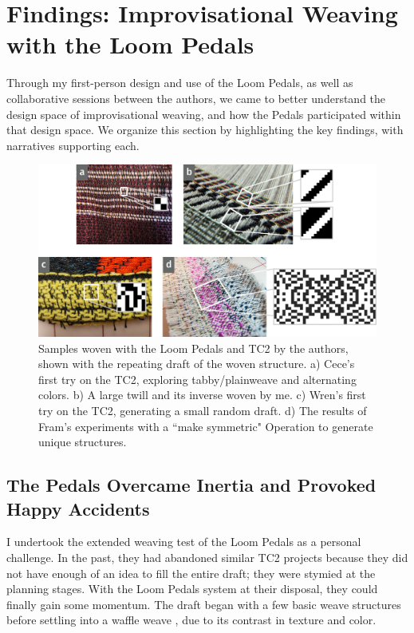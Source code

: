 \section{Findings: Improvisational Weaving with the Loom Pedals}

Through my first-person design and use of the Loom Pedals, as well as collaborative sessions between the authors, we came to better understand the design space of improvisational weaving, and how the Pedals participated within that design space. We organize this section by highlighting the key findings, with narratives supporting each.

\begin{figure}
    \centering
    \includegraphics[width=\linewidth]{figs/LP_author-samples.png}
    \caption[Samples woven with the Loom Pedals and TC2.]{Samples woven with the Loom Pedals and TC2 by the authors, shown with the repeating draft of the woven structure. a) Cece's first try on the TC2, exploring tabby/plainweave and alternating colors. b) A large twill and its inverse woven by me. c) Wren's first try on the TC2, generating a small random draft. d) The results of Fram's experiments with a ``make symmetric" Operation to generate unique structures.}
    \label{fig:author-samples}
\end{figure}

\subsection{The Pedals Overcame Inertia and Provoked Happy Accidents}

I undertook the extended weaving test of the Loom Pedals as a personal challenge. In the past, they had abandoned similar TC2 projects because they did not have enough of an idea to fill the entire draft; they were stymied at the planning stages. With the Loom Pedals system at their disposal, they could finally gain some momentum. The draft began with a few basic weave structures before settling into a waffle weave
, due to its contrast in texture and color. 

